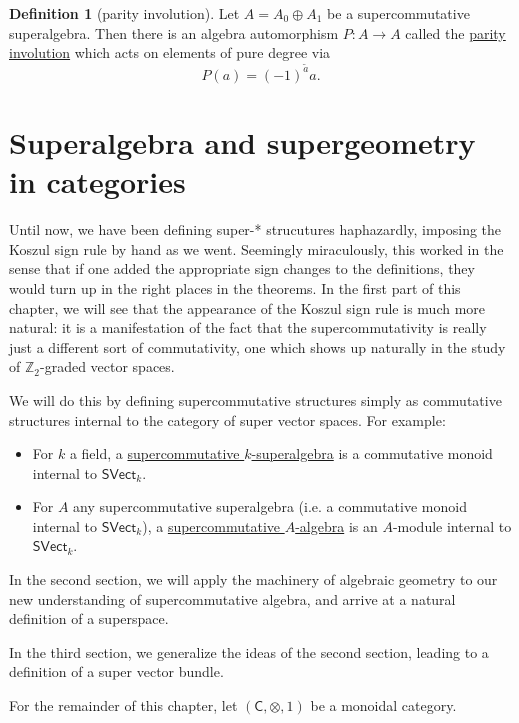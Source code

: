 \documentclass[a4paper,10pt]{scrreprt}
\newcommand{\Z}{\mathbb{Z}}
\newcommand{\defn}[1]{\ul{#1}}
\theoremstyle{definition}
\newtheorem{definition}{Definition}[section]
\theoremstyle{plain}
\theoremstyle{remark}
\begin{document}
\begin{definition}[parity involution]
  \label{def:parityinvolution}
  Let $A = A_{0} \oplus A_{1}$ be a supercommutative superalgebra. Then there is an algebra automorphism $P\colon A\to A$ called the \defn{parity involution} which acts on elements of pure degree via
  \begin{equation*}
    P(a) = (-1)^{\tilde{a}}a.
  \end{equation*}
\end{definition}

\chapter{Superalgebra and supergeometry in categories}
Until now, we have been defining super-* strucutures haphazardly, imposing the Koszul sign rule by hand as we went. Seemingly miraculously, this worked in the sense that if one added the appropriate sign changes to the definitions, they would turn up in the right places in the theorems. In the first part of this chapter, we will see that the appearance of the Koszul sign rule is much more natural: it is a manifestation of the fact that the supercommutativity is really just a different sort of commutativity, one which shows up naturally in the study of $\Z_{2}$-graded vector spaces.

We will do this by defining supercommutative structures simply as commutative structures internal to the category of super vector spaces. For example:
\begin{itemize}
  \item For $k$ a field, a \defn{supercommutative $k$-superalgebra} is a commutative monoid internal to $\mathsf{SVect}_{k}$.

  \item For $A$ any supercommutative superalgebra (i.e. a commutative monoid internal to $\mathsf{SVect}_{k}$), a \defn{supercommutative $A$-algebra} is an $A$-module internal to $\mathsf{SVect}_{k}$.
\end{itemize}

In the second section, we will apply the machinery of algebraic geometry to our new understanding of supercommutative algebra, and arrive at a natural definition of a superspace.

In the third section, we generalize the ideas of the second section, leading to a definition of a super vector bundle.

For the remainder of this chapter, let $(\mathsf{C}, \otimes, 1)$ be a monoidal category.
\end{document}
